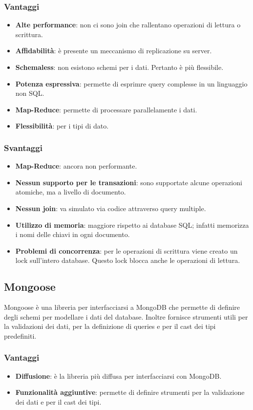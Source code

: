 \subsubsection{Vantaggi}
\begin{itemize}
\item \textbf{Alte performance}: non ci sono join che rallentano operazioni di lettura o scrittura. 
\item \textbf{Affidabilit\`a}: \`e presente un meccanismo di replicazione su server.
\item \textbf{Schemaless}: non esistono schemi per i dati. Pertanto \`e pi\`u flessibile.
\item \textbf{Potenza espressiva}: permette di esprimre query complesse in un linguaggio non SQL.
\item \textbf{Map-Reduce}: permette di processare parallelamente i dati.
\item \textbf{Flessibilit\`a}: per i tipi di dato.
\end{itemize}
\subsubsection{Svantaggi}
\begin{itemize}
\item \textbf{Map-Reduce}: ancora non performante.
\item \textbf{Nessun supporto per le transazioni}: sono supportate alcune operazioni atomiche, ma a livello di documento.
\item \textbf{Nessun join}: va simulato via codice attraverso query multiple.
\item \textbf{Utilizzo di memoria}: maggiore rispetto ai database SQL; infatti memorizza i nomi delle chiavi in ogni documento. 
\item \textbf{Problemi di concorrenza}: per le operazioni di scrittura viene creato un lock sull'intero database. Questo lock blocca anche le operazioni di lettura.
\end{itemize}
\subsection{Mongoose}
Mongoose \`e una libreria per interfacciarsi a MongoDB che permette di definire degli schemi per modellare i dati del database. Inoltre fornisce strumenti utili per la validazioni dei dati, per la definizione di queries e per il cast dei tipi predefiniti.
\subsubsection{Vantaggi}
\begin{itemize}
\item \textbf{Diffusione}: \`e la libreria pi\`u diffusa per interfacciarsi con MongoDB.
\item \textbf{Funzionalit\`a aggiuntive}: permette di definire strumenti per la validazione dei dati e per il cast dei tipi.
\end{itemize}
